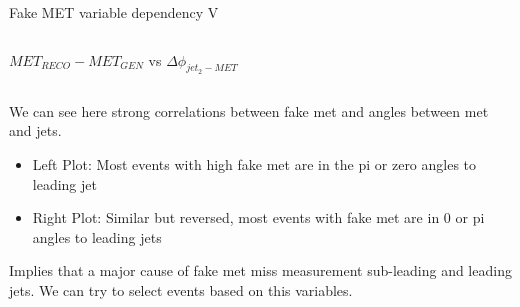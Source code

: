\documentclass[8pt]{beamer}
\begin{document}
\begin{frame}{Fake MET variable dependency V}
\begin{columns}
\begin{block}{$MET_{RECO}-MET_{GEN}$ vs $\Delta\phi_{jet_2-MET}$}
\end{block}

\end{columns}

We can see here strong correlations between fake met and angles between met and jets.

\begin{itemize}
  \item Left Plot: Most events with high fake met are in the pi or zero angles to leading jet 
  \item Right Plot: Similar but reversed, most events with fake met are in 0 or pi angles to leading jets
\end{itemize}

Implies that a major cause of fake met miss measurement sub-leading and leading jets. We can try to select events based on this variables.

\end{frame}
\end{document}
